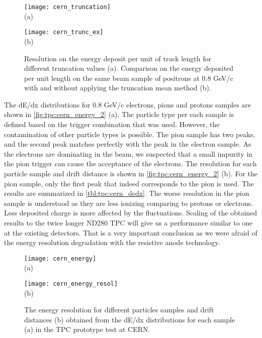 \documentclass[../main.tex]{subfiles}
\begin{document}
\begin{figure}[!ht]
  \centering
  \begin{minipage}{0.49\linewidth}
    \centering
    \texttt{[image: cern\_truncation]} \\ (a)
  \end{minipage}
  \begin{minipage}{0.49\linewidth}
    \centering
    \texttt{[image: cern\_trunc\_ex]} \\ (b)
  \end{minipage}
  \caption{Resolution on the energy deposit per unit of track length for different truncation values (a). Comparison on the energy deposited per unit length on the same beam sample of positrons at 0.8 GeV/c with and without applying the truncation mean method (b).}
  \label{fig:tpc:cern_energy_1}
\end{figure}

The dE/dx distributions for 0.8 GeV/c electrons, pions and protons samples are shown in \autoref{fig:tpc:cern_energy_2} (a). The particle type per each sample is defined based on the trigger combination that was used. However, the contamination of other particle types is possible. The pion sample has two peaks, and the second peak matches perfectly with the peak in the electron sample. As the electrons are dominating in the beam, we suspected that a small impurity in the pion trigger can cause the acceptance of the electrons. The resolution for each particle sample and drift distance is shown in \autoref{fig:tpc:cern_energy_2} (b). For the pion sample, only the first peak that indeed corresponds to the pion is used. The results are summarized in \autoref{tbl:tpc:cern_dedx}. The worse resolution in the pion sample is understood as they are less ionizing comparing to protons or electrons. Less deposited charge is more affected by the fluctuations. Scaling of the obtained results to the twice longer ND280 TPC will give us a performance similar to one at the existing detectors. That is a very important conclusion as we were afraid of the energy resolution degradation with the resistive anode technology.

\begin{figure}[!ht]
  \centering
  \begin{minipage}{0.49\linewidth}
    \centering
    \texttt{[image: cern\_energy]} \\ (a)
  \end{minipage}
  \begin{minipage}{0.49\linewidth}
    \centering
    \texttt{[image: cern\_energy\_resol]} \\ (b)
  \end{minipage}
  \caption{The energy resolution for different particles samples and drift distances (b) obtained from the dE/dx distributions for each sample (a) in the TPC prototype test at CERN.}
  \label{fig:tpc:cern_energy_2}
\end{figure}
\end{document}
